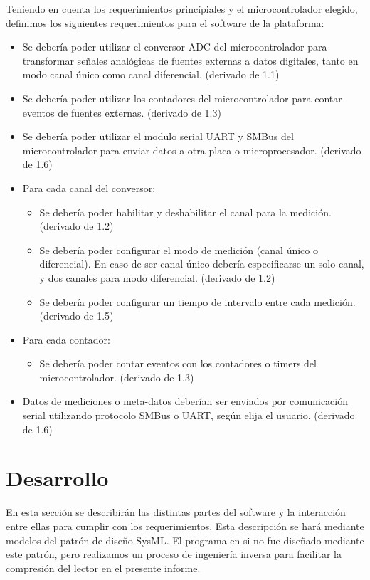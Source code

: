 Teniendo en cuenta los requerimientos princípiales y el microcontrolador elegido, definimos los siguientes requerimientos para el software de la plataforma:

\begin{itemize}
\item Se debería poder utilizar el conversor ADC del microcontrolador para transformar señales analógicas de fuentes externas a datos digitales, tanto en modo canal único como canal diferencial. (derivado de 1.1)
\item Se debería poder utilizar los contadores del microcontrolador para contar eventos de fuentes externas. (derivado de 1.3)
\item Se debería poder utilizar el modulo serial UART y SMBus del microcontrolador para enviar datos a otra placa o microprocesador. (derivado de 1.6)
\item Para cada canal del conversor:
\begin{itemize}
\item Se debería poder habilitar y deshabilitar el canal para la medición. (derivado de 1.2)
\item Se debería poder configurar el modo de medición (canal único o diferencial). En caso de ser canal único debería especificarse un solo canal, y dos canales para modo diferencial. (derivado de 1.2)
\item Se debería poder configurar un tiempo de intervalo entre cada medición. (derivado de 1.5)
\end{itemize}
\item Para cada contador:
\begin{itemize}
\item Se debería poder contar eventos con los contadores o timers del microcontrolador. (derivado de 1.3)
\end{itemize}
\item Datos de mediciones o meta-datos deberían ser enviados por comunicación serial utilizando protocolo SMBus o UART, según elija el usuario. (derivado de 1.6)

\end{itemize}



\section{Desarrollo} %
\label{it2:sec:desarrollo}

En esta sección se describirán las distintas partes del software y la interacción entre ellas para cumplir con los requerimientos. Esta descripción se hará mediante modelos del patrón de diseño SysML. El programa en si no fue diseñado mediante este patrón, pero realizamos un proceso de ingeniería inversa para facilitar la compresión del lector en el presente informe.

